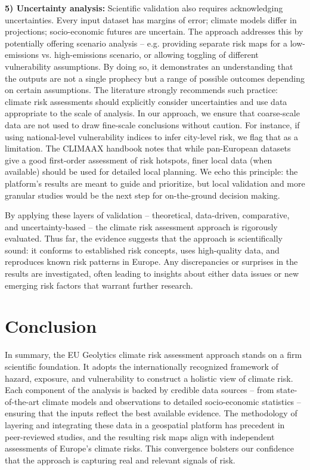 \documentclass[10pt, conference]{IEEEtran}
\begin{document}
\textbf{5) Uncertainty analysis:} Scientific validation also requires acknowledging uncertainties. Every input dataset has margins of error; climate models differ in projections; socio-economic futures are uncertain. The approach addresses this by potentially offering scenario analysis – e.g. providing separate risk maps for a low-emissions vs. high-emissions scenario, or allowing toggling of different vulnerability assumptions. By doing so, it demonstrates an understanding that the outputs are not a single prophecy but a range of possible outcomes depending on certain assumptions. The literature strongly recommends such practice: climate risk assessments should explicitly consider uncertainties and use data appropriate to the scale of analysis. In our approach, we ensure that coarse-scale data are not used to draw fine-scale conclusions without caution. For instance, if using national-level vulnerability indices to infer city-level risk, we flag that as a limitation. The CLIMAAX handbook notes that while pan-European datasets give a good first-order assessment of risk hotspots, finer local data (when available) should be used for detailed local planning. We echo this principle: the platform’s results are meant to guide and prioritize, but local validation and more granular studies would be the next step for on-the-ground decision making.

By applying these layers of validation – theoretical, data-driven, comparative, and uncertainty-based – the climate risk assessment approach is rigorously evaluated. Thus far, the evidence suggests that the approach is scientifically sound: it conforms to established risk concepts, uses high-quality data, and reproduces known risk patterns in Europe. Any discrepancies or surprises in the results are investigated, often leading to insights about either data issues or new emerging risk factors that warrant further research.

\section{Conclusion}
In summary, the EU Geolytics climate risk assessment approach stands on a firm scientific foundation. It adopts the internationally recognized framework of hazard, exposure, and vulnerability to construct a holistic view of climate risk. Each component of the analysis is backed by credible data sources – from state-of-the-art climate models and observations to detailed socio-economic statistics – ensuring that the inputs reflect the best available evidence. The methodology of layering and integrating these data in a geospatial platform has precedent in peer-reviewed studies, and the resulting risk maps align with independent assessments of Europe’s climate risks. This convergence bolsters our confidence that the approach is capturing real and relevant signals of risk.
\end{document}
